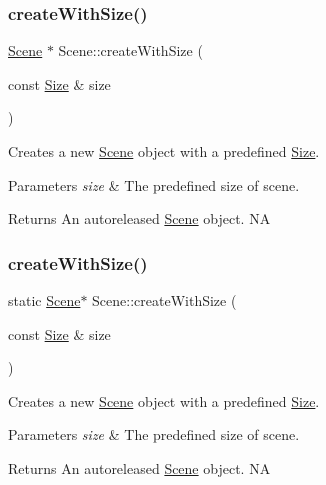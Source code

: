 \subsubsection{\texorpdfstring{create\+With\+Size()}{createWithSize()}\hspace{0.1cm}{\footnotesize\ttfamily [1/2]}}
{\footnotesize\ttfamily \hyperlink{classScene}{Scene} $\ast$ Scene\+::create\+With\+Size (\begin{DoxyParamCaption}\item[{const \hyperlink{classSize}{Size} \&}]{size }\end{DoxyParamCaption})\hspace{0.3cm}{\ttfamily [static]}}

Creates a new \hyperlink{classScene}{Scene} object with a predefined \hyperlink{classSize}{Size}.


\begin{DoxyParams}{Parameters}
{\em size} & The predefined size of scene. \\
\hline
\end{DoxyParams}
\begin{DoxyReturn}{Returns}
An autoreleased \hyperlink{classScene}{Scene} object.  NA 
\end{DoxyReturn}
\mbox{\label{classScene_a755586699d886f1bc64e9d35eca863d3}} 
\subsubsection{\texorpdfstring{create\+With\+Size()}{createWithSize()}\hspace{0.1cm}{\footnotesize\ttfamily [2/2]}}
{\footnotesize\ttfamily static \hyperlink{classScene}{Scene}$\ast$ Scene\+::create\+With\+Size (\begin{DoxyParamCaption}\item[{const \hyperlink{classSize}{Size} \&}]{size }\end{DoxyParamCaption})\hspace{0.3cm}{\ttfamily [static]}}

Creates a new \hyperlink{classScene}{Scene} object with a predefined \hyperlink{classSize}{Size}.


\begin{DoxyParams}{Parameters}
{\em size} & The predefined size of scene. \\
\hline
\end{DoxyParams}
\begin{DoxyReturn}{Returns}
An autoreleased \hyperlink{classScene}{Scene} object.  NA 
\end{DoxyReturn}
\mbox{\label{classScene_adceefa9911890dde81660ddbc15c34e3}} 
